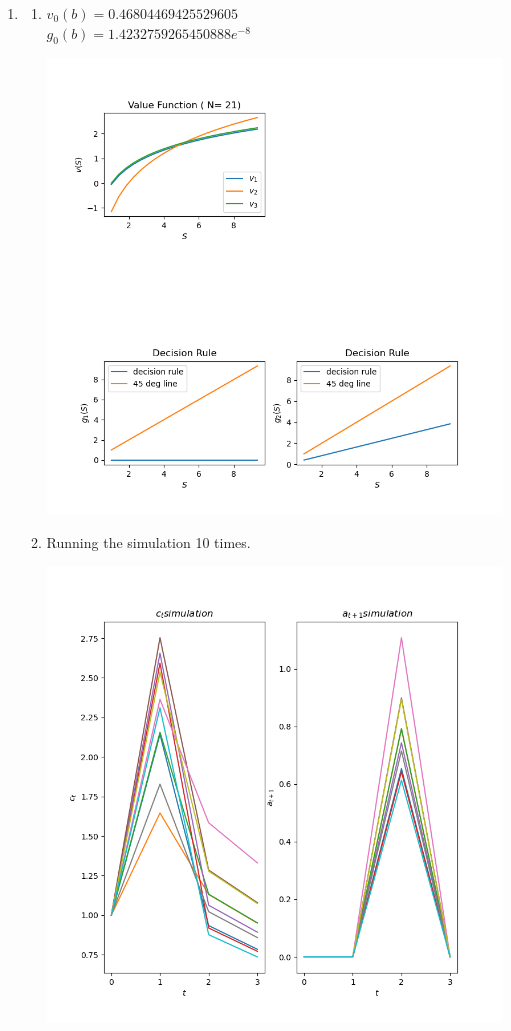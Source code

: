 \documentclass[12pt]{article}
\begin{document}
\begin{enumerate}
	\item
		\begin{enumerate}
			\item $v_0(b) = 0.46804469425529605$	
				\\ $g_0(b) = 1.4232759265450888e^{-8}$
				\begin{center}
					\includegraphics[width=\textwidth]{2_a.png}
				\end{center}
			\item Running the simulation 10 times.	
				\begin{center}
					\includegraphics[width=\textwidth]{2_b.png}
				\end{center}

		\end{enumerate}
\end{enumerate} 
\end{document}
